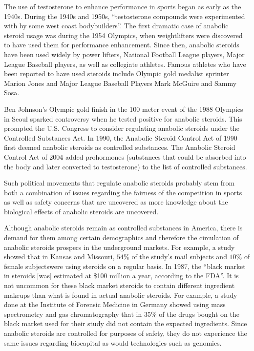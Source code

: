 The use of testosterone to enhance performance in sports began as early as the 1940s. \cite{anabolex} During the 1940s and 1950s, “testosterone compounds were experimented with by some west coast bodybuilders”. \cite{yesalis} The first dramatic case of anabolic steroid usage was during the 1954 Olympics, when weightlifters were discovered to have used them for performance enhancement. Since then, anabolic steroids have been used widely by power lifters, National Football League players, Major League Baseball players, as well as collegiate athletes. \cite{hoffman} Famous athletes who have been reported to have used steroids include Olympic gold medalist sprinter Marion Jones and Major League Baseball Players Mark McGuire and Sammy Sosa.

	
Ben Johnson's Olympic gold finish in the 100 meter  event of the 1988 Olympics in Seoul sparked controversy when he tested positive for anabolic steroids. This prompted the U.S. Congress to consider regulating anabolic steroids under the Controlled Substances Act. In 1990, the Anabolic Steroid Control Act of 1990 first deemed anabolic steroids as controlled substances.  The Anabolic Steroid Control Act of 2004 added prohormones (substances that could be absorbed into the body and later converted to testosterone) to the list of controlled substances. \cite{checkana}
	
Such political movements that regulate anabolic steroids probably stem from both a combination of issues regarding the fairness of the competition in sports as well as safety concerns that are uncovered as more knowledge about the biological effects of anabolic steroids are uncovered. 

Although anabolic steroids remain as controlled substances in America, there is demand for them among certain demographics and therefore the circulation of anabolic steroids prospers in the underground markets. For example, a study showed that in Kansas and Missouri, $54\%$ of the study's mail subjects and $10\%$ of female subjectswere using steroids on a regular basis. \cite{tricker} In 1987, the “black market in steroids [was] estimated at \$100 million a year, according to the FDA”. \cite{stehlin} It is not uncommon for these black market steroids to contain different ingredient makeups than what is found in actual anabolic steroids. For example, a study done at the Institute of Forensic Medicine in Germany showed using mass spectrometry and gas chromatography that in $35\%$ of the drugs bought on the black market used for their study did not contain the expected ingredients.  Since anabolic steroids are controlled for purposes of safety, they do not experience the same issues regarding biocapital as would technologies such as genomics. 

